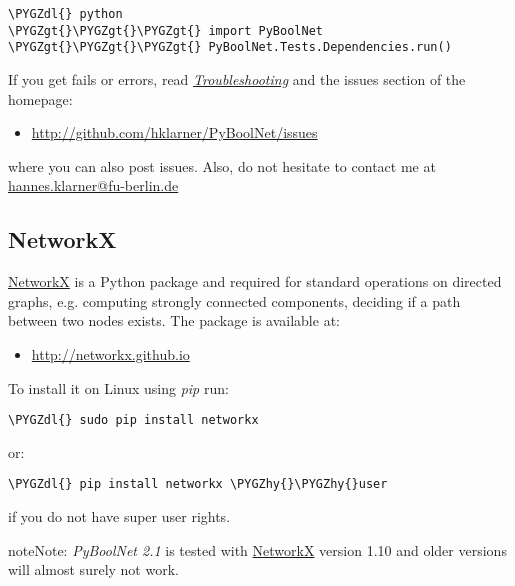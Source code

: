 \documentclass[letterpaper,10pt,english]{sphinxmanual}
\def\PYGZgt{\char`\>}
\def\PYGZdl{\char`\$}
\def\PYGZhy{\char`\-}
\begin{document}
\begin{Verbatim}[commandchars=\\\{\}]
\PYGZdl{} python
\PYGZgt{}\PYGZgt{}\PYGZgt{} import PyBoolNet
\PYGZgt{}\PYGZgt{}\PYGZgt{} PyBoolNet.Tests.Dependencies.run()
\end{Verbatim}

If you get fails or errors, read {\hyperref[Installation:installation-troubleshooting]{\emph{Troubleshooting}}} and the issues section of the homepage:
\begin{itemize}
\item {} 
\href{http://github.com/hklarner/PyBoolNet/issues}{http://github.com/hklarner/PyBoolNet/issues}

\end{itemize}

where you can also post issues. Also, do not hesitate to contact me at \href{mailto:hannes.klarner@fu-berlin.de}{hannes.klarner@fu-berlin.de}


\subsection{NetworkX}
\label{Installation:installation-networkx}\label{Installation:networkx}
\href{https://networkx.github.io/}{NetworkX} is a Python package and required for standard operations on directed graphs, e.g. computing strongly connected components,
deciding if a path between two nodes exists.
The package is available at:
\begin{itemize}
\item {} 
\href{http://networkx.github.io}{http://networkx.github.io}

\end{itemize}

To install it on Linux using \emph{pip} run:

\begin{Verbatim}[commandchars=\\\{\}]
\PYGZdl{} sudo pip install networkx
\end{Verbatim}

or:

\begin{Verbatim}[commandchars=\\\{\}]
\PYGZdl{} pip install networkx \PYGZhy{}\PYGZhy{}user
\end{Verbatim}

if you do not have super user rights.

\begin{notice}{note}{Note:}
\emph{PyBoolNet 2.1} is tested with \href{https://networkx.github.io/}{NetworkX} version 1.10 and older versions will almost surely not work.
\end{notice}
\end{document}
